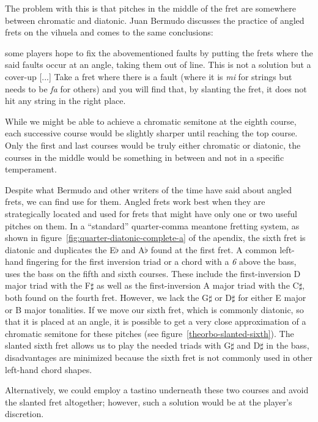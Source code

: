 The problem with this is that pitches in the middle of the fret are somewhere between
chromatic and diatonic.  Juan Bermudo discusses the practice of angled frets on the
vihuela and comes to the same conclusions:
\begin{blocks}
[...] some players hope to fix the abovementioned faults by putting the frets where the
said faults occur at an angle, taking them out of line. This is not a solution but a
cover-up [...] Take a fret where there is a fault (where it is \textit{mi} for strings
but needs to be \textit{fa} for others) and you will find that, by slanting the fret,
it does not hit any string in the right place. \autocite[112-113]{DE:1}
\end{blocks}
While we might be able to achieve a chromatic semitone at the eighth course, each
successive course would be slightly sharper until reaching the top course.  Only the
first and last courses would be truly either chromatic or diatonic, the courses in the
middle would be something in between and not in a specific temperament.

Despite what Bermudo and other writers of the time have said about angled frets, we can
find use for them.  Angled frets work best when they are strategically located and used
for frets that might have only one or two useful pitches on them. In a ``standard''
quarter-comma meantone fretting system, as shown in
figure~\ref{fig:quarter-diatonic-complete-a} of the apendix, the sixth fret is diatonic
and duplicates the E$\flat$ and A$\flat$ found at the first fret.  A common left-hand
fingering for the first inversion triad or a chord with a \textit{6} above the bass,
uses the bass on the fifth and sixth courses. These include the first-inversion D major
triad with the F$\sharp$ as well as the first-inversion A major triad with the
C$\sharp$, both found on the fourth fret. However, we lack the G$\sharp$ or D$\sharp$
for either E major or B major tonalities. If we move our sixth fret, which is commonly
diatonic, so that it is placed at an angle, it is possible to get a very close
approximation of a chromatic semitone for these pitches (see
figure~\ref{theorbo-slanted-sixth}).  The slanted sixth fret allows us to play the
needed triads with G$\sharp$ and D$\sharp$ in the bass, disadvantages are minimized
because the sixth fret is not commonly used in other left-hand chord shapes.

Alternatively, we could employ a tastino underneath these two courses and avoid the
slanted fret altogether; however, such a solution would be at the player's discretion.

